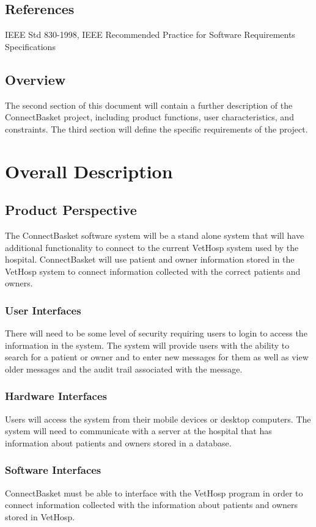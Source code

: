 \documentclass[onecolumn, draftclsnofoot,10pt, compsoc]{IEEEtran}
\begin{document}
\subsection{References}
IEEE Std 830-1998, IEEE Recommended Practice for Software Requirements Specifications

\subsection{Overview}
The second section of this document will contain a further description of the ConnectBasket project, including product functions, user characteristics, and constraints. The third section will define the specific requirements of the project. 

\section{Overall Description}

\subsection{Product Perspective}
The ConnectBasket software system will be a stand alone system that will have additional functionality to connect to the current VetHosp system used by the hospital. ConnectBasket will use patient and owner information stored in the VetHosp system to connect information collected with the correct patients and owners.

\subsubsection{User Interfaces}
There will need to be some level of security requiring users to login to access the information in the system. The system will provide users with the ability to search for a patient or owner and to enter new messages for them as well as view older messages and the audit trail associated with the message.

\subsubsection{Hardware Interfaces}
Users will access the system from their mobile devices or desktop computers. The system will need to communicate with a server at the hospital that has information about patients and owners stored in a database.

\subsubsection{Software Interfaces}
ConnectBasket must be able to interface with the VetHosp program in order to connect information collected with the information about patients and owners stored in VetHosp.
\end{document}

